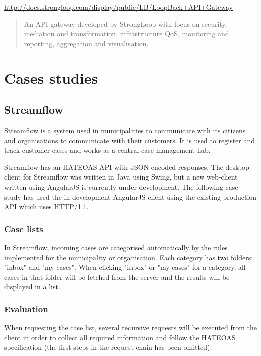 \documentclass{cslthse-msc}
\begin{document}
\noindent \url{http://docs.strongloop.com/display/public/LB/LoopBack+API+Gateway}

\begin{quote}
	An API-gateway developed by StrongLoop with focus on security, mediation and transformation, infrastructure QoS, monitoring and reporting, aggregation and visualisation. 
\end{quote}


\chapter{Cases studies}
\section{Streamflow}
Streamflow\cite{streamflow} is a system used in municipalities to communicate with its citizens and organisations to communicate with their customers. It is used to register and track customer cases and works as a central case management hub.

Streamflow has an HATEOAS API with JSON-encoded responses. The desktop client for Streamflow was written in Java using Swing, but a new web-client written using AngularJS is currently under development. The following case study has used the in-development AngularJS client using the existing production API which uses HTTP/1.1.

\subsection{Case lists}
In Streamflow, incoming cases are categorised automatically by the rules implemented for the municipality or organisation. Each category has two folders: "inbox" and "my cases". When clicking "inbox" or "my cases" for a category, all cases in that folder will be fetched from the server and the results will be displayed in a list.

\subsection{Evaluation}
When requesting the case list, several recursive requests will be executed from the client in order to collect all required information and follow the HATEOAS specification (the first steps in the request chain has been omitted):
\end{document}
